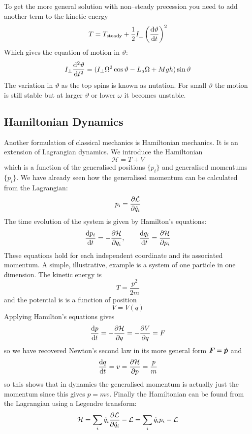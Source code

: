 \documentclass{article}
\newcommand{\LL}{\mathcal{L}}
\newcommand{\HH}{\mathcal{H}}
\begin{document}
    To get the more general solution with non--steady precession you need to add another term to the kinetic energy
    \[T = T_\text{steady} + \frac{1}{2}I_\perp\left(\dv{\vartheta}{t}\right)^2\]
    Which gives the equation of motion in \(\vartheta\):
    \[I_\perp\dv[2]{\vartheta}{t} = (I_\perp\Omega^2\cos\vartheta - L_a\Omega + Mgh)\sin\vartheta\]
    The variation in \(\vartheta\) as the top spins is known as nutation.
    For small \(\vartheta\) the motion is still stable but at larger \(\vartheta\) or lower \(\omega\) it becomes unstable.
    
    \subsection{Hamiltonian Dynamics}
    Another formulation of classical mechanics is Hamiltonian mechanics.
    It is an extension of Lagrangian dynamics.
    We introduce the Hamiltonian
    \[\HH = T + V\]
    which is a function of the generalised positions \(\{p_i\}\) and generalised momentums \(\{p_i\}\).
    We have already seen how the generalised momentum can be calculated from the Lagrangian:
    \[p_i = \pdv{\LL}{\dot q_i}\]
    The time evolution of the system is given by Hamilton's equations:
    \[\dv{p_i}{t} = -\pdv{\HH}{q_i},\qquad \dv{q_i}{t} = \pdv{\HH}{p_i}\]
    These equations hold for each independent coordinate and its associated momentum.
    A simple, illustrative, example is a system of one particle in one dimension.
    The kinetic energy is
    \[T = \frac{p^2}{2m}\]
    and the potential is is a function of position
    \[V = V(q)\]
    Applying Hamilton's equations gives
    \[\dv{p}{t} = -\pdv{\HH}{q} = -\pdv{V}{q} = F\]
    so we have recovered Newton's second law in its more general form \(\bm{F} = \dot{\bm{p}}\) and
    \[\dv{q}{t} = v = \pdv{\HH}{p} = \frac{p}{m}\]
    so this shows that in dynamics the generalised momentum is actually just the momentum since this gives \(p = mv\).
    Finally the Hamiltonian can be found from the Lagrangian using a Legendre transform:
    \[\HH = \sum_i \dot q_i\pdv{\LL}{\dot q_i} - \LL = \sum_i \dot q_ip_i - \LL\]
\end{document}
